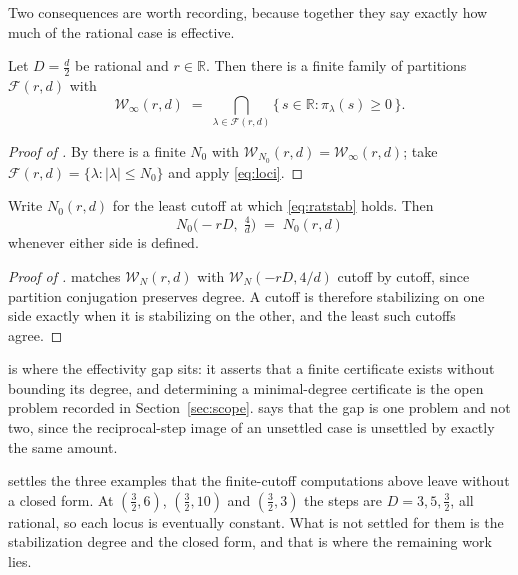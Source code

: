 \documentclass[11pt,letterpaper]{article}
\newcommand{\Rr}{\mathbb{R}}
\begin{document}
Two consequences are worth recording, because together they say exactly how much
of the rational case is effective.

\begin{corollary}
\label{cor:certificate}
Let $D=\tfrac d2$ be rational and $r\in\Rr$. Then there is a finite family of
partitions $\mathcal F(r,d)$ with
\begin{equation}
  \mathcal{W}_\infty(r,d)
  \;=\;\bigcap_{\lambda\in\mathcal F(r,d)}\bigl\{\,s\in\Rr:\pi_\lambda(s)\ge0\,\bigr\}.
  \label{eq:certificate}
\end{equation}
\end{corollary}

\begin{proof}[Proof of ]
By  there is a finite $N_0$ with
$\mathcal W_{N_0}(r,d)=\mathcal W_\infty(r,d)$; take
$\mathcal F(r,d)=\{\lambda:|\lambda|\le N_0\}$ and apply \eqref{eq:loci}.
\end{proof}

\begin{corollary}
\label{cor:n0dual}
Write $N_0(r,d)$ for the least cutoff at which \eqref{eq:ratstab} holds. Then
\begin{equation}
  N_0\bigl(-rD,\;\tfrac4d\bigr)\;=\;N_0(r,d)
  \label{eq:n0dual}
\end{equation}
whenever either side is defined.
\end{corollary}

\begin{proof}[Proof of ]
 matches $\mathcal W_N(r,d)$ with
$\mathcal W_N(-rD,4/d)$ cutoff by cutoff, since partition conjugation preserves
degree. A cutoff is therefore stabilizing on one side exactly when it is
stabilizing on the other, and the least such cutoffs agree.
\end{proof}

 is where the effectivity gap sits: it asserts that a
finite certificate exists without bounding its degree, and determining a
minimal-degree certificate is the open problem recorded in
Section~\ref{sec:scope}.  says that the gap is one problem and
not two, since the reciprocal-step image of an unsettled case is unsettled by
exactly the same amount.

 settles the three examples that the finite-cutoff computations
above leave without a closed form. At $(\tfrac32,6)$, $(\tfrac32,10)$ and
$(\tfrac32,3)$ the steps are $D=3,5,\tfrac32$, all rational, so each locus is
eventually constant. What is not settled for them is the stabilization degree and
the closed form, and that is where the remaining work lies.
\end{document}

